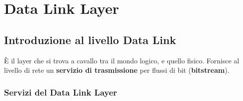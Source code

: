 \chapter{Data Link Layer}

\section{Introduzione al livello Data Link}

È il layer che si trova a cavallo tra il mondo logico, e quello fisico. Fornisce al livello di rete un \textbf{servizio di trasmissione} per flussi di bit (\textbf{bitstream}).

\subsection{Servizi del Data Link Layer}
